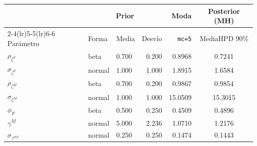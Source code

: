 \begin{tabular}{@{}lllrrc@{}}
\toprule
 & \multicolumn{3}{c}{Prior} & Moda & Posterior (MH) \\
\cmidrule(lr){2-4}\cmidrule(lr){5-5}\cmidrule(lr){6-6}
Par\'ametro & Forma & Media & Desv\'io & \texttt{mc=5} & Media\quad HPD 90\% \\
\midrule
$\rho_{\zeta^F}$ & beta & 0.700 & 0.200 & 0.8968 & 0.7241\quad[0.4352,\,0.9851] \\
$\sigma_{\zeta^F}$ & normal & 1.000 & 1.000 & 1.8915 & 1.6584\quad[0.0031,\,2.9772] \\
$\rho_{\zeta^M}$ & beta & 0.700 & 0.200 & 0.9867 & 0.9854\quad[0.9758,\,0.9953] \\
$\sigma_{\zeta^M}$ & normal & 1.000 & 1.000 & 15.0509 & 15.3015\quad[14.0802,\,16.5374] \\
$\phi_F$ & beta & 0.500 & 0.250 & 0.4509 & 0.4896\quad[0.0854,\,0.8883] \\
$\gamma^M$ & normal & 5.000 & 2.236 & 1.0710 & 1.2176\quad[1.0020,\,1.4505] \\
$\sigma_{z^{m2}}$ & normal & 0.250 & 0.250 & 0.1474 & 0.1443\quad[0.1055,\,0.1894] \\
\bottomrule
\end{tabular}
